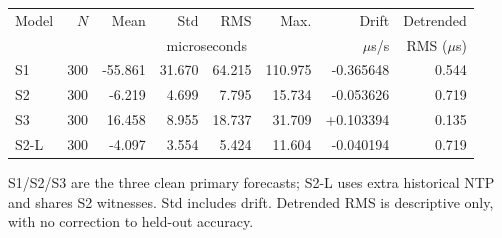 \begin{center}\small
\begin{tabular}{lrrrrrrr}\toprule
Model & $N$ & Mean & Std & RMS & Max. & Drift & Detrended \\
 & & \multicolumn{4}{c}{microseconds} & $\mu$s/s & RMS ($\mu$s) \\ \midrule
S1 & 300 & -55.861 & 31.670 & 64.215 & 110.975 & -0.365648 & 0.544 \\
S2 & 300 & -6.219 & 4.699 & 7.795 & 15.734 & -0.053626 & 0.719 \\
S3 & 300 & 16.458 & 8.955 & 18.737 & 31.709 & +0.103394 & 0.135 \\
S2-L & 300 & -4.097 & 3.554 & 5.424 & 11.604 & -0.040194 & 0.719 \\
\bottomrule\end{tabular}\end{center}
{\small S1/S2/S3 are the three clean primary forecasts; S2-L uses extra historical NTP and shares S2 witnesses. Std includes drift. Detrended RMS is descriptive only, with no correction to held-out accuracy.}
